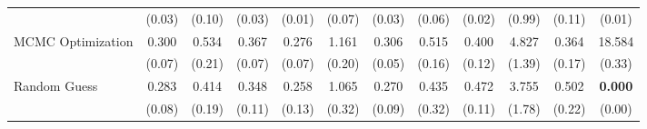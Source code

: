 \begin{table}[ht]
{\begin{tabular}{l cccc cccc cc c}
             & (0.03) & (0.10) & (0.03) & (0.01) & (0.07) & (0.03) & (0.06) & (0.02) & (0.99) & (0.11) & (0.01) \\
            \addlinespace[0.2em]
            MCMC Optimization & 0.300 & 0.534 & 0.367 & 0.276 & 1.161 & 0.306 & 0.515 & 0.400 & 4.827 & 0.364 & 18.584 \\
             & (0.07) & (0.21) & (0.07) & (0.07) & (0.20) & (0.05) & (0.16) & (0.12) & (1.39) & (0.17) & (0.33) \\
            \addlinespace[0.2em]
            Random Guess & 0.283 & 0.414 & 0.348 & 0.258 & 1.065 & 0.270 & 0.435 & 0.472 & 3.755 & 0.502 & \textbf{0.000} \\
             & (0.08) & (0.19) & (0.11) & (0.13) & (0.32) & (0.09) & (0.32) & (0.11) & (1.78) & (0.22) & (0.00) \\
            \bottomrule
        \end{tabular}%
    }
\end{table}